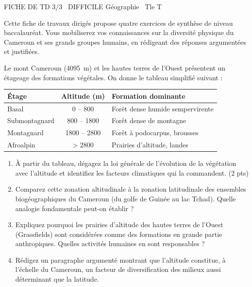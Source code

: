\documentclass[11pt]{article}
\begin{document}
\begin{tcolorbox}[enhanced,colback=popink,colframe=popink,arc=10pt,boxrule=0pt,left=12pt,right=12pt,top=9pt,bottom=9pt]
{\color{white}\popxbold\small FICHE DE TD 3/3 \textbullet\ DIFFICILE \hfill Géographie \textbullet\ Tle T\par}
\end{tcolorbox}
\vspace{4pt}
Cette fiche de travaux dirigés propose quatre exercices de synthèse de niveau baccalauréat. Vous mobiliserez vos connaissances sur la diversité physique du Cameroun et ses grands groupes humains, en rédigeant des réponses argumentées et justifiées.

\begin{exercice}
Le mont Cameroun (\SI{4095}{m}) et les hautes terres de l'Ouest présentent un étageage des formations végétales. On donne le tableau simplifié suivant :

\begin{center}
\begin{tabular}{|l|c|l|}
\hline
\textbf{Étage} & \textbf{Altitude (m)} & \textbf{Formation dominante} \\
\hline
Basal & 0 -- 800 & Forêt dense humide sempervirente \\
\hline
Submontagnard & 800 -- 1800 & Forêt dense de montagne \\
\hline
Montagnard & 1800 -- 2800 & Forêt à podocarpus, brousses \\
\hline
Afroalpin & > 2800 & Prairies d'altitude, landes \\
\hline
\end{tabular}
\end{center}

\begin{enumerate}
\item À partir du tableau, dégagez la loi générale de l'évolution de la végétation avec l'altitude et identifiez les facteurs climatiques qui la commandent. (2 pts)
\item Comparez cette zonation altitudinale à la zonation latitudinale des ensembles biogéographiques du Cameroun (du golfe de Guinée au lac Tchad). Quelle analogie fondamentale peut-on établir ?
\item Expliquez pourquoi les prairies d'altitude des hautes terres de l'Ouest (Grassfields) sont considérées comme des formations en grande partie anthropiques. Quelles activités humaines en sont responsables ?
\item Rédigez un paragraphe argumenté montrant que l'altitude constitue, à l'échelle du Cameroun, un facteur de diversification des milieux aussi déterminant que la latitude.
\end{enumerate}
\end{exercice}
\end{document}
